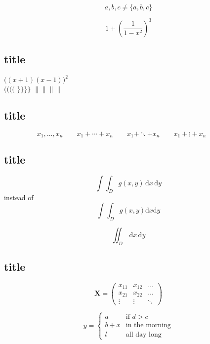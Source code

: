 \documentclass[UTF8]{ctexart}
\begin{document}
\begin{displaymath}
{a,b,c}\neq\{a,b,c\}
\end{displaymath}

\begin{displaymath}
1 + \left( \frac{1}{ 1-x^{2} }
\right) ^3
\end{displaymath}
\subsection{title}
$\Big( (x+1) (x-1) \Big) ^{2}$\\
$\big(\Big(\bigg(\Bigg($\quad
$\big\}\Big\}\bigg\}\Bigg\}$\quad
$\big\|\Big\|\bigg\|\Bigg\|$
\subsection{title}
\begin{displaymath}
x_{1},\ldots,x_{n} \qquad
x_{1}+\cdots+x_{n} \qquad
x_{1}+\ddots+x_{n} \qquad
x_{1}+\vdots+x_{n} \qquad
\end{displaymath}
\subsection{title}
\newcommand{\ud}{\mathrm{d}}
\begin{displaymath}
\int\!\!\!\int_{D} g(x,y)
\, \ud x\, \ud y
\end{displaymath}
instead of
\begin{displaymath}
\int\int_{D} g(x,y)\ud x \ud y
\end{displaymath}


\begin{displaymath}
\iint_{D} \,  \ud x \, \ud y
\end{displaymath}
\subsection{title}

\begin{displaymath}
\mathbf{X} =
\left( \begin{array}{ccc}
x_{11} & x_{12} & \ldots \\
x_{21} & x_{22} & \ldots \\
\vdots & \vdots & \ddots
\end{array} \right)
\end{displaymath}

\begin{displaymath}
y = \left\{ \begin{array}{ll}
a & \textrm{if $d>c$}\\
b+x & \textrm{in the morning}\\
l & \textrm{all day long}
\end{array} \right.
\end{displaymath}
\end{document}
